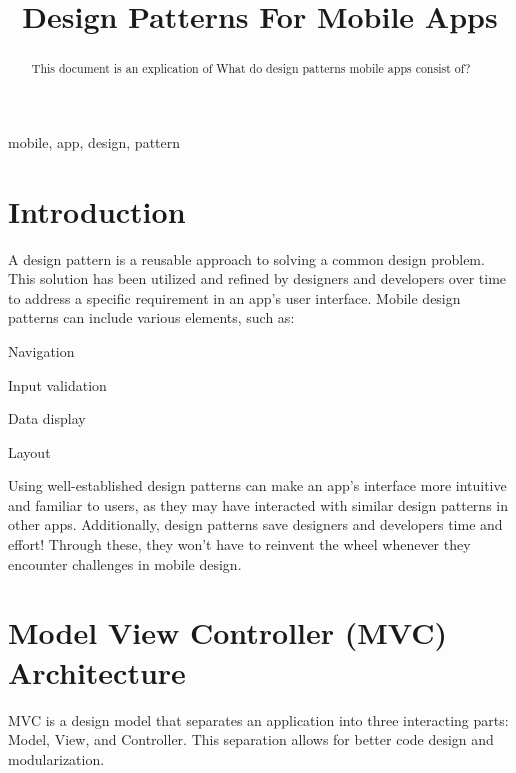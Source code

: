 \documentclass[conference]{IEEEtran}
\begin{document}
\title{Design Patterns For Mobile Apps\\
}

\author{
}

\maketitle

\begin{abstract}
This document is an explication of What do design patterns mobile apps consist of?
\end{abstract}

\begin{IEEEkeywords}
mobile, app, design, pattern
\end{IEEEkeywords}

\section{Introduction}
A design pattern is a reusable approach to solving a common design problem. This solution has been utilized and refined by designers and developers over time to address a specific requirement in an app's user interface.
Mobile design patterns can include various elements, such as:

Navigation

Input validation

Data display

Layout

Using well-established design patterns can make an app's interface more intuitive and familiar to users, as they may have interacted with similar design patterns in other apps.
Additionally, design patterns save designers and developers time and effort! Through these, they won’t have to reinvent the wheel whenever they encounter challenges in mobile design.

\section{Model View Controller (MVC) Architecture}
MVC is a design model that separates an application into three interacting parts: Model, View, and Controller. This separation allows for better code design and modularization.
\end{document}
